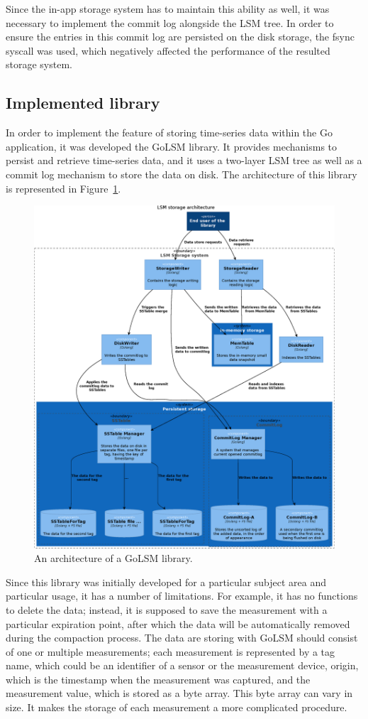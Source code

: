 Since the in-app storage system has to maintain this ability as well, it was necessary to implement the commit log alongside the LSM tree. In order to ensure the entries in this commit log are persisted on the disk storage, the fsync syscall was used, which negatively affected the performance of the resulted storage system.

\subsection{Implemented library}
In order to implement the feature of storing time-series data within the Go application, it was developed the GoLSM library. It provides mechanisms to persist and retrieve time-series data, and it uses a two-layer LSM tree as well as a commit log mechanism to store the data on disk. The architecture of this library is represented in Figure~\ref{fig2}.
\begin{figure}[h!]
\includegraphics[width=\textwidth,keepaspectratio]{figures/golsm-arch.eps}
\caption{An architecture of a GoLSM library.} \label{fig2}
\end{figure}

 Since this library was initially developed for a particular subject area and particular usage, it has a number of limitations. For example, it has no functions to delete the data; instead, it is supposed to save the measurement with a particular expiration point, after which the data will be automatically removed during the compaction process. The data are storing with GoLSM should consist of one or multiple measurements; each measurement is represented by a tag name, which could be an identifier of a sensor or the measurement device, origin, which is the timestamp when the measurement was captured, and the measurement value, which is stored as a byte array. This byte array can vary in size. It makes the storage of each measurement a more complicated procedure.

